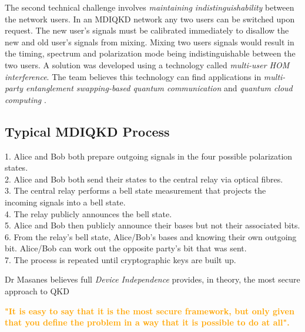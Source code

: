 \documentclass[journal]{vgtc}
\begin{document}
\noindent The second technical challenge involves \textit{maintaining indistinguishability} between the network users. In an MDIQKD network any two users can be switched upon request. The new user's signals must be calibrated immediately to disallow the new and old user's signals from mixing. Mixing two users signals would result in the timing, spectrum and polarization mode being indistinguishable between the two users. A solution was developed using a technology called \textit{multi-user HOM interference}. The team believes this technology can find applications in \textit{multi-party entanglement swapping-based quantum communication} and \textit{quantum cloud computing }.


\begin{tcolorbox}
\section*{Typical MDIQKD Process}

1. Alice and Bob both prepare outgoing signals in the four possible polarization states.\\
2. Alice and Bob both send their states to the central relay via optical fibres.\\
3. The central relay performs a bell state measurement that projects the incoming signals into a bell state.\\
4. The relay publicly announces the bell state.\\
5. Alice and Bob then publicly announce their bases but not their associated bits.\\
6. From the relay's bell state, Alice/Bob's bases and knowing their own outgoing bit. Alice/Bob can work out the opposite party's bit that was sent.\\
7. The process is repeated until cryptographic keys are built up.

\end{tcolorbox}


 
\noindent Dr Masanes believes full \textit{Device Independence} provides, in theory, the most secure approach to QKD

\vspace{0.3cm}

\textcolor{orange}{\textbf{"It is easy to say  that it is the most secure framework, but only given that you define the problem in a way that it is possible to do at all".}}

\vspace{0.3cm}
\end{document}
